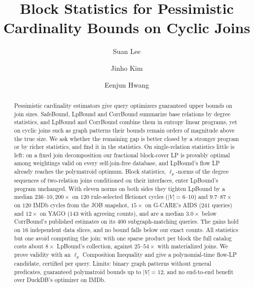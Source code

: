 \documentclass[sigconf, nonacm, acmthm=false]{acmart}
\begin{document}
\title{Block Statistics for Pessimistic Cardinality Bounds on Cyclic Joins}

\author{Suan Lee}

\author{Jinho Kim}

\author{Eenjun Hwang}

\begin{abstract}
Pessimistic cardinality estimators give query optimizers guaranteed upper
bounds on join sizes. SafeBound, LpBound and CorrBound summarize base
relations by degree statistics, and LpBound and CorrBound combine them in
entropy linear programs, yet on cyclic joins such as graph patterns their
bounds remain orders of magnitude above the true size. We ask whether the
remaining gap is better closed by a stronger program or by richer
statistics, and find it in the statistics. On single-relation statistics
little is left: on a fixed join decomposition our fractional block-cover LP
is provably optimal among weightings valid on every self-join-free
database, and LpBound's flow LP already reaches the polymatroid optimum.
Block statistics, $\ell_p$-norms of the degree sequences of two-relation
joins conditioned on their interfaces, enter LpBound's program unchanged.
With eleven norms on both sides they tighten LpBound by a median
$236$--$10{,}200\times$ on $120$ rule-selected Hetionet cycles
($|V|{=}6$--$10$) and $9.7$--$87\times$ on $120$ IMDb cycles from the JOB
snapshot, $15\times$ on G-CARE's AIDS ($241$ queries) and $12\times$ on
YAGO ($143$ with agreeing counts), and are a median $3.0\times$ below
CorrBound's published estimates on its $400$ subgraph-matching queries.
The gains hold on $16$ independent data slices, and no bound falls below
our exact counts. All statistics but one avoid computing the join: with one
sparse product per block the full catalog costs about $8\times$ LpBound's
collection, against $25$--$54\times$ with materialized joins. We prove
validity with an $\ell_p$ Composition Inequality and give a polynomial-time
flow-LP candidate, certified per query. Limits: binary graph patterns
without general predicates, guaranteed polymatroid bounds up to
$|V|{=}12$, and no end-to-end benefit over DuckDB's optimizer on IMDb.
\end{abstract}
\end{document}
